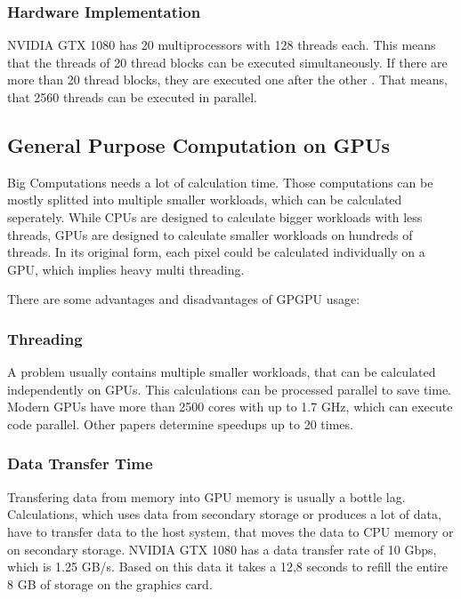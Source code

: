 \documentclass[conference]{IEEEtran}
\begin{document}
	\subsubsection{Hardware Implementation}
	NVIDIA GTX 1080 has 20 multiprocessors with 128 threads each. This means that the threads of 20 thread blocks can be executed simultaneously. If there are more than 20 thread blocks, they are executed one after the other \cite{1080gtxdepth}.
	That means, that 2560 threads can be executed in parallel.
	
	
	
	\subsection{General Purpose Computation on GPUs}
		
		
		
		Big Computations needs a lot of calculation time. Those computations can be mostly splitted into multiple smaller workloads, which can be calculated seperately. \cite{GPGPUCompiler} While CPUs are designed to calculate bigger workloads with less threads, GPUs are designed to calculate smaller workloads on hundreds of threads. In its original form, each pixel could be calculated individually on a GPU, which implies heavy multi threading.\cite{myth}
		
		
		
		There are some advantages and disadvantages of GPGPU usage:
		
		\subsubsection{Threading} A problem usually contains multiple smaller workloads, that can be calculated independently on GPUs. This calculations can be processed parallel to save time. Modern GPUs have more than 2500 cores with up to 1.7 GHz, which can execute code parallel. Other papers determine speedups up to 20 times.\cite{1080gtx} \cite{speedup}
		
		
		\subsubsection{Data Transfer Time}  Transfering data from memory into GPU memory is usually a bottle lag. Calculations, which uses data from secondary storage or produces a lot of data, have to transfer data to the host system, that moves the data to CPU memory or on secondary storage. NVIDIA GTX 1080 has a data transfer rate of 10 Gbps, which is 1.25 GB/s. Based on this data it takes a 12,8 seconds to refill the entire 8 GB of storage on the graphics card. \cite{1080gtx} \cite{transferspeedup}
		
\end{document}
